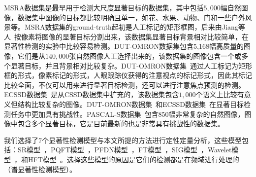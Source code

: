 MSRA数据集是最早用于检测大尺度显著目标的数据集，其中包括$5,000$幅自然图像，数据集中图像的目标都比较明确且单一，如花、水果、动物、门和一些户外风景等。MSRA数据集的ground-truth起初是人工标记的矩形框图，后来由Jiang等人~\cite{JiangHuaizuCVPR2013Discriminative}按像素将图像的显著目标分割出来，该数据集显著目标背景相对比较简单，在显著性检测的实验中比较容易检测。DUT-OMRON数据集\cite{YangChuanCVPR2013Manifold}包含5,168幅高质量的图像，它们是从$140,000$张自然图像人工选择出来的，该数据集的图像包含一个或多个显著目标，并且背景相对比较复杂。DUT-OMRON数据集~\cite{YangChuanCVPR2013Manifold}通过人工标记为矩形框的形式，像素标记的形式，人眼跟踪仪获得的注意视点的标记形式，因此其标记比较全面，不仅可以用来进行显著目标检测，还可以进行注意焦点预测的检测。ECSSD数据集~\cite{YanQiongCVPR2013Hierarchical}是从CSSD数据集中扩充的，该数据集包含$1,000$个语义上比较有意义但结构比较复杂的图像。DUT-OMRON数据集~\cite{YangChuanCVPR2013Manifold}和ECSSD数据集~\cite{YanQiongCVPR2013Hierarchical}在显著目标检测任务中更加具有挑战性。PASCAL-S数据集~\cite{LiYinCVPR2014Secrets}包含$850$幅非常复杂的自然图像，图像中包含多个显著目标，它是目前最新的也是非常具有挑战性的数据集。

我们选择了$7$个显著性检测模型与本文所提的方法进行定性定量分析，这些模型包括：SR模型~\cite{HouXiaodiCVPR2007Residual}，PQFT模型~\cite{GuoChenleiCVPR2008Spatio}，PFDN模型~\cite{BianCognNeurodyn2010Visual}，FT模型~\cite{AchantaCVPR2009Frequency}，SIG模型~\cite{HouXiaodiTPAMI2012Signature}，Wavelet模型~\cite{ImamogluTMM2013wavelet}，和HFT模型~\cite{LiJianTPAMI2013Scale}。选择这些模型的原因是它们的检测都是在频域进行处理的（谱显著性检测模型）。

